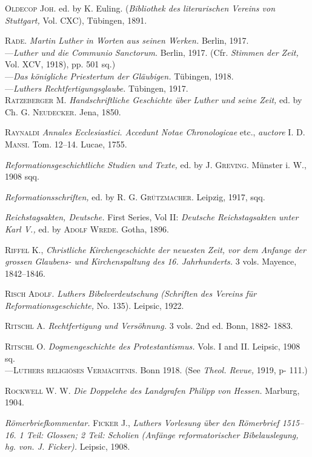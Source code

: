 \textsc{Oldecop Joh.} ed. by K. Euling. (\textit{Bibliothek des literarischen Vereins von
Stuttgart,} Vol. CXC), Tübingen, 1891.

\textsc{Rade.} \textit{Martin Luther in Worten aus seinen Werken.} Berlin, 1917. \\
---\textit{Luther und die Communio Sanctorum.} Berlin, 1917. (Cfr. \textit{Stimmen der
Zeit,} Vol. XCV, 1918), pp. 501 sq.) \\
---\textit{Das königliche Priestertum der Gläubigen.} Tübingen, 1918. \\
---\textit{Luthers Rechtfertigungsglaube.} Tübingen, 1917. \\

\textsc{Ratzeberger M.} \textit{Handschriftliche Geschichte über Luther und seine Zeit,}
ed. by Ch. \textsc{G. Neudecker.} Jena, 1850.

\textsc{Raynaldi} \textit{Annales Ecclesiastici. Accedunt Notae Chronologicae} etc., \textit{auctore}
\textsc{I. D. Mansi.} Tom. 12--14. Lucae, 1755.

\textit{Reformationsgeschichtliche Studien und Texte,} ed. by \textsc{J. Greving.} Münster i.
W., 1908 sqq.

\textit{Reformationsschriften,} ed. by \textsc{R. G. Grützmacher.} Leipzig, 1917, sqq.

\textit{Reichstagsakten, Deutsche.} First Series, Vol II: \textit{Deutsche Reichstagsakten
unter Karl V.,} ed. by \textsc{Adolf Wrede}. Gotha, 1896.

\textsc{Riffel K.}, \textit{Christliche Kirchengeschichte der neuesten Zeit, vor dem Anfange
der grossen Glaubens- und Kirchenspaltung des 16. Jahrhunderts.}
3 vols. Mayence, 1842--1846.

\textsc{Risch Adolf.} \textit{Luthers Bibelverdeutschung (Schriften des Vereins für Reformationsgeschichte,}
No. 135). Leipsic, 1922.

\textsc{Ritschl A.} \textit{Rechtfertigung und Versöhnung.} 3 vols. 2nd ed. Bonn, 1882-
1883.

\textsc{Ritschl O.} \textit{Dogmengeschichte des Protestantismus.} Vols. I and II. Leipsic,
1908 sq. \\
---\textsc{Luthers religiöses Vermächtnis.} Bonn 1918. (See \textit{Theol. Revue,} 1919, p-
111.)

\textsc{Rockwell W. W.} \textit{Die Doppelehe des Landgrafen Philipp von Hessen.} Marburg,
1904.

\textit{Römerbriefkommentar.} \textsc{Ficker J.}, \textit{Luthers Vorlesung über den Römerbrief
1515--16. 1 Teil: Glossen; 2 Teil: Scholien (Anfänge reformatorischer
Bibelauslegung, hg. von. J. Ficker).} Leipsic, 1908.


